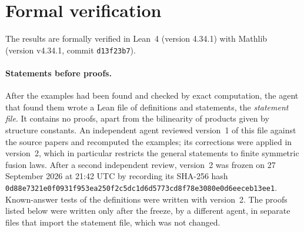 \documentclass[11pt]{article}
\newif\ifwithC
\theoremstyle{definition}
\theoremstyle{remark}
\begin{document}
\section{Formal verification}\label{sec:lean}

The results are formally verified in Lean~4 (version 4.34.1) with
Mathlib~\cite{mathlib} (version v4.34.1, commit \texttt{d13f23b7}).

\paragraph{Statements before proofs.}
After the examples had been found and checked by exact computation, the
agent that found them wrote a Lean file of definitions and statements, the
\emph{statement file}. It contains no proofs, apart from the bilinearity of
products given by structure constants. An independent agent reviewed
version~1 of this file against the source papers and recomputed the
examples; its corrections were applied in version~2, which in particular
restricts the general statements to finite symmetric fusion laws. After a
second independent review, version~2 was frozen on 27 September 2026 at
21:42 UTC by recording its SHA-256 hash
\texttt{0d88e7321e0f0931f953ea250f2c5dc1d6d5773cd8f78e3080e0d6eeceb13ee1}.
Known-answer tests of the definitions were written with version~2. The
proofs listed below were written only after the freeze, by a different agent,
in separate files that import the statement file, which was not changed.
\ifwithC
Two further statements about the algebra $D$, used in
Remark~\ref{rem:D}(2), were added later in a separate file: the agent that
wrote the proofs wrote them, an independent agent of the same system
reviewed them, and they were frozen on 27 September 2026 at 23:55 UTC
(SHA-256
\texttt{afd751c0df8ba036995314a0efd7a5b60d6b333ab9958111a879724d81fc9175})
before their proofs were written.
\fi
\end{document}
